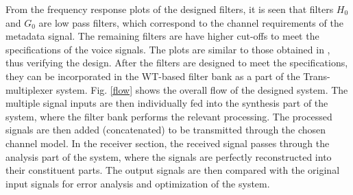 From the frequency response plots of the designed filters, it is seen that filters $H_0$ and $G_0$ are low pass filters, which correspond to the channel requirements of the metadata signal. The remaining filters are have higher cut-offs to meet the specifications of the voice signals. The plots are similar to those obtained in \cite{b2} \cite{b5}, thus verifying the design. After the filters are designed to meet the specifications, they can be incorporated in the WT-based filter bank as a part of the Trans-multiplexer system. Fig. \ref{flow} shows the overall flow of the designed system. The multiple signal inputs are then individually fed into the synthesis part of the system, where the filter bank performs the relevant processing. The processed signals are then added (concatenated) to be transmitted through the chosen channel model. In the receiver section, the received signal passes through the analysis part of the system, where the signals are perfectly reconstructed into their constituent parts. The output signals are then compared with the original input signals for error analysis and optimization of the system.


